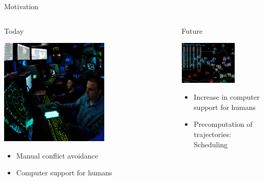 \documentclass[10pt]{beamer}
\begin{document}
\begin{frame}[t]{Motivation}
	\begin{columns}[c]
        \hspace{0.1cm}
        \begin{block}{Today}
			\begin{center}
                    \includegraphics[width=0.6\textwidth]{images/atm_controller_small.jpg}
			\end{center}
            \begin{itemize}
                \item Manual conflict avoidance
                \item Computer support for humans
            \end{itemize}
        \end{block}
        \begin{block}{Future}
			\begin{center}
                    \includegraphics[width=0.65\textwidth]{images/atm_controller_software.png}
			\end{center}
            \begin{itemize}
                \item Increase in computer support for humans
                \item Precomputation of trajectories: Scheduling
            \end{itemize}
        \end{block}
	\end{columns}
\end{frame}
\end{document}
